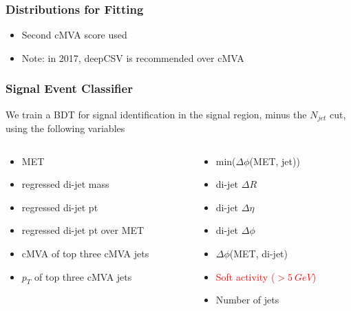 \documentclass{beamer}
\begin{document}
\begin{frame}
  \frametitle{Distributions for Fitting}
  \begin{itemize}
  \item Second cMVA score used
  \item Note: in 2017, deepCSV is recommended over cMVA
  \end{itemize}
\end{frame}

\begin{frame}
  \frametitle{Signal Event Classifier}
  We train a BDT for signal identification in the signal region, minus the $N_{jet}$ cut,
  using the following variables
  \begin{columns}
    \begin{column}{0.5\linewidth}
      \begin{itemize}
      \item MET
      \item regressed di-jet mass
      \item regressed di-jet pt
      \item regressed di-jet pt over MET
      \item cMVA of top three cMVA jets
      \item $p_T$ of top three cMVA jets
      \end{itemize}
    \end{column}
    \begin{column}{0.5\linewidth}
      \begin{itemize}
      \item min($\Delta \phi$(MET, jet))
      \item di-jet $\Delta R$
      \item di-jet $\Delta \eta$
      \item di-jet $\Delta \phi$
      \item $\Delta \phi$(MET, di-jet)
      \item \textcolor{red}{Soft activity ($> \SI{5}{GeV}$)}
      \item Number of jets
      \end{itemize}
    \end{column}
  \end{columns}
\end{frame}
\end{document}

